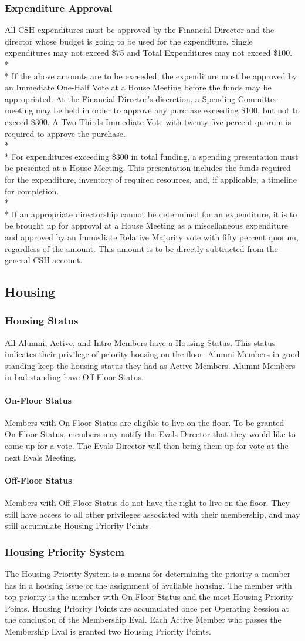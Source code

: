 \documentclass{article}
\newcommand{\asection}[1]{\subsection{#1} \label{#1}}
\newcommand{\asubsection}[1]{\subsubsection{#1} \label{#1}}
\newcommand{\asubsubsection}[1]{\paragraph{#1} \label{#1}}
\begin{document}
\asubsection{Expenditure Approval}
All CSH expenditures must be approved by the Financial Director and the director whose budget is going to be used for the expenditure.
Single expenditures may not exceed \$75 and Total Expenditures may not exceed \$100.
\\* \\*
If the above amounts are to be exceeded, the expenditure must be approved by an Immediate One-Half Vote at a House Meeting before the funds may be appropriated.
At the Financial Director's discretion, a Spending Committee meeting may be held in order to approve any purchase exceeding \$100, but not to exceed \$300.
A Two-Thirds Immediate Vote with twenty-five percent quorum is required to approve the purchase.
\\*\\*
For expenditures exceeding \$300 in total funding, a spending presentation must be presented at a House Meeting.
This presentation includes the funds required for the expenditure, inventory of required resources, and, if applicable, a timeline for completion.
\\* \\*
If an appropriate directorship cannot be determined for an expenditure, it is to be brought up for approval at a House Meeting as a miscellaneous expenditure and approved by an Immediate Relative Majority vote with fifty percent quorum, regardless of the amount.
This amount is to be directly subtracted from the general CSH account.
\asection{Housing}

\asubsection{Housing Status}
All Alumni, Active, and Intro Members have a Housing Status.
This status indicates their privilege of priority housing on the floor.
Alumni Members in good standing keep the housing status they had as Active Members.
Alumni Members in bad standing have Off-Floor Status.

\asubsubsection{On-Floor Status}
Members with On-Floor Status are eligible to live on the floor.
To be granted On-Floor Status, members may notify the Evals Director that they would like to come up for a vote.
The Evals Director will then bring them up for vote at the next Evals Meeting.

\asubsubsection{Off-Floor Status}
Members with Off-Floor Status do not have the right to live on the floor.
They still have access to all other privileges associated with their membership, and may still accumulate Housing Priority Points.

\asubsection{Housing Priority System}
The Housing Priority System is a means for determining the priority a member has in a housing issue or the assignment of available housing.
The member with top priority is the member with On-Floor Status and the most Housing Priority Points.
Housing Priority Points are accumulated once per Operating Session at the conclusion of the Membership Eval.
Each Active Member who passes the Membership Eval is granted two Housing Priority Points.
\end{document}
